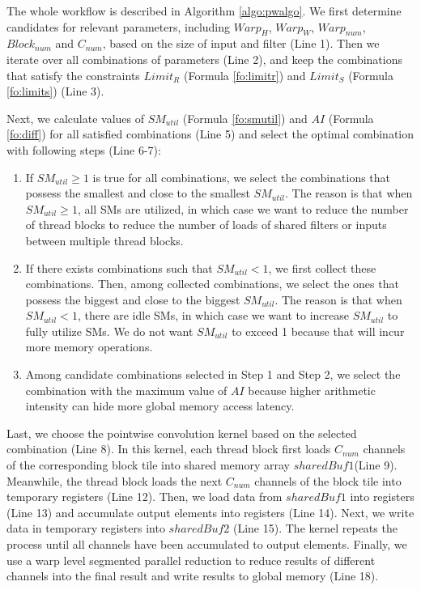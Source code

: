 The whole workflow is described in Algorithm \ref{algo:pwalgo}.
We first determine candidates for relevant parameters, including $Warp_H$, $Warp_W$, $Warp_{num}$, $Block_{num}$ and $C_{num}$, based on the size of input and filter (Line 1).
Then we iterate over all combinations of parameters (Line 2), and keep the combinations that satisfy the constraints $Limit_R$ (Formula \ref{fo:limitr}) and $Limit_S$ (Formula \ref{fo:limits}) (Line 3).

Next, we calculate values of $SM_{util}$ (Formula \ref{fo:smutil}) and $AI$ (Formula \ref{fo:diff}) for all satisfied combinations (Line 5) and select the optimal combination with following steps (Line 6-7):
\begin{enumerate}[Step 1]
    \item If $SM_{util} \geq 1$ is true for all combinations, we select the combinations that possess the smallest and close to the smallest $SM_{util}$.
    The reason is that when $SM_{util} \geq 1$, all SMs are utilized, in which case we want to reduce the number of thread blocks to reduce the number of loads of shared filters or inputs between multiple thread blocks.
    \item If there exists combinations such that $SM_{util}<1$, we first collect these combinations. Then, among collected combinations, we select the ones that possess the biggest and close to the biggest $SM_{util}$.
    The reason is that when $SM_{util}<1$, there are idle SMs, in which case we want to increase $SM_{util}$ to fully utilize SMs. We do not want $SM_{util}$ to exceed 1 because that will incur more memory operations.
    \item Among candidate combinations selected in Step 1 and Step 2, we select the combination with the maximum value of $AI$ because higher arithmetic intensity can hide more global memory access latency.
\end{enumerate}

Last, we choose the pointwise convolution kernel based on the selected combination (Line 8).
In this kernel, each thread block first loads $C_{num}$ channels of the corresponding block tile into shared memory array $sharedBuf1$(Line 9).
Meanwhile, the thread block loads the next $C_{num}$ channels of the block tile into temporary registers (Line 12).
Then, we load data from $sharedBuf1$ into registers (Line 13) and accumulate output elements into registers (Line 14).
Next, we write data in temporary registers into $sharedBuf2$ (Line 15).
The kernel repeats the process until all channels have been accumulated to output elements.
Finally, we use a warp level segmented parallel reduction to reduce results of different channels into the final result and write results to global memory (Line 18).
